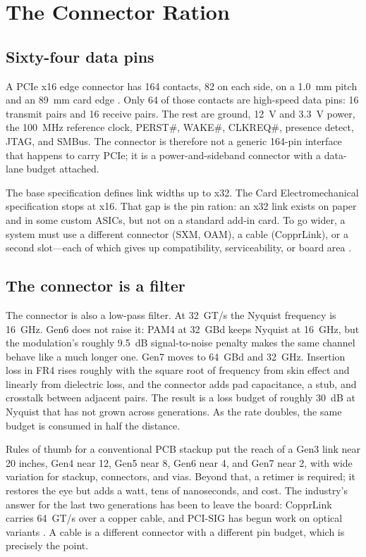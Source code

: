 \documentclass[10pt,letterpaper]{article}
\begin{document}
\section{The Connector Ration}
\label{sec:connector}

\subsection{Sixty-four data pins}

A PCIe x16 edge connector has 164 contacts, 82 on each side, on a 1.0~mm pitch and an 89~mm card edge \cite{cem}. Only 64 of those contacts are high-speed data pins: 16 transmit pairs and 16 receive pairs. The rest are ground, 12~V and 3.3~V power, the 100~MHz reference clock, PERST\#, WAKE\#, CLKREQ\#, presence detect, JTAG, and SMBus. The connector is therefore not a generic 164-pin interface that happens to carry PCIe; it is a power-and-sideband connector with a data-lane budget attached.

The base specification defines link widths up to x32. The Card Electromechanical specification stops at x16. That gap is the pin ration: an x32 link exists on paper and in some custom ASICs, but not on a standard add-in card. To go wider, a system must use a different connector (SXM, OAM), a cable (CopprLink), or a second slot---each of which gives up compatibility, serviceability, or board area \cite{cem,copprlink}.

\subsection{The connector is a filter}

The connector is also a low-pass filter. At 32~GT/s the Nyquist frequency is 16~GHz. Gen6 does not raise it: PAM4 at 32~GBd keeps Nyquist at 16~GHz, but the modulation's roughly 9.5~dB signal-to-noise penalty makes the same channel behave like a much longer one. Gen7 moves to 64~GBd and 32~GHz. Insertion loss in FR4 rises roughly with the square root of frequency from skin effect and linearly from dielectric loss, and the connector adds pad capacitance, a stub, and crosstalk between adjacent pairs. The result is a loss budget of roughly 30~dB at Nyquist that has not grown across generations. As the rate doubles, the same budget is consumed in half the distance.

Rules of thumb for a conventional PCB stackup put the reach of a Gen3 link near 20 inches, Gen4 near 12, Gen5 near 8, Gen6 near 4, and Gen7 near 2, with wide variation for stackup, connectors, and vias. Beyond that, a retimer is required; it restores the eye but adds a watt, tens of nanoseconds, and cost. The industry's answer for the last two generations has been to leave the board: CopprLink carries 64~GT/s over a copper cable, and PCI-SIG has begun work on optical variants \cite{copprlink}. A cable is a different connector with a different pin budget, which is precisely the point.
\end{document}
